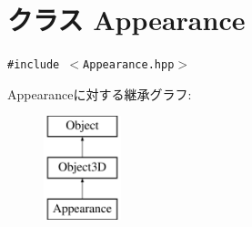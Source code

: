 \hypertarget{classm3g_1_1Appearance}{
\section{クラス Appearance}
\label{classm3g_1_1Appearance}
}
{\tt \#include $<$Appearance.hpp$>$}

Appearanceに対する継承グラフ:\begin{figure}[H]
\begin{center}
\leavevmode
\includegraphics[height=3cm]{classm3g_1_1Appearance}
\end{center}
\end{figure}
